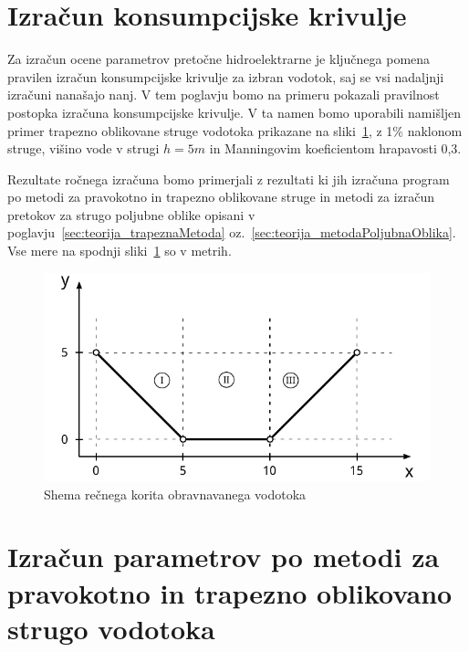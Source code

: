 \newpage

\section{Izračun konsumpcijske krivulje}\label{sec:izracun}

Za izračun ocene parametrov pretočne hidroelektrarne je ključnega pomena pravilen izračun konsumpcijske krivulje za izbran vodotok, saj se vsi nadaljnji izračuni nanašajo nanj. V tem poglavju bomo na primeru pokazali pravilnost postopka izračuna konsumpcijske krivulje. V ta namen bomo uporabili namišljen primer trapezno oblikovane struge vodotoka prikazane na sliki~\ref{fig:izracun_trapeznaStruga}, z 1\% naklonom struge, višino vode v strugi $h=5m$ in Manningovim koeficientom hrapavosti 0,3.

Rezultate ročnega izračuna bomo primerjali z rezultati ki jih izračuna program po metodi za pravokotno in trapezno oblikovane struge in metodi za izračun pretokov za strugo poljubne oblike opisani v poglavju~\ref{sec:teorija_trapeznaMetoda}  oz.~\ref{sec:teorija_metodaPoljubnaOblika}. Vse mere na spodnji  sliki~\ref{fig:izracun_trapeznaStruga} so v metrih.



\begin{figure}[ht!]
	\begin{centering}
		\includegraphics{slike/izracuni/shema_trapezneStruge.pdf}		
		\caption{Shema rečnega korita obravnavanega vodotoka}\label{fig:izracun_trapeznaStruga}
	\end{centering}
\end{figure}




\section{Izračun parametrov po metodi za pravokotno in trapezno oblikovano strugo vodotoka}\label{sec:izracun_trapeznaMetoda}

